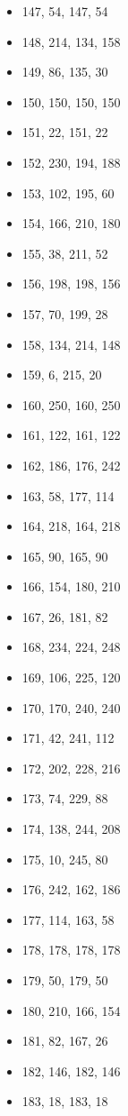 \documentclass[12pt, fleqn]{report}                             %
\theoremstyle{break}                                            %
\begin{document}
\begin{itemize}
        \item 147, 54, 147, 54
        \item 148, 214, 134, 158
        \item 149, 86, 135, 30
        \item 150, 150, 150, 150
        \item 151, 22, 151, 22
        \item 152, 230, 194, 188
        \item 153, 102, 195, 60
        \item 154, 166, 210, 180
        \item 155, 38, 211, 52
        \item 156, 198, 198, 156
        \item 157, 70, 199, 28
        \item 158, 134, 214, 148
        \item 159, 6, 215, 20
        \item 160, 250, 160, 250
        \item 161, 122, 161, 122
        \item 162, 186, 176, 242
        \item 163, 58, 177, 114
        \item 164, 218, 164, 218
        \item 165, 90, 165, 90
        \item 166, 154, 180, 210
        \item 167, 26, 181, 82
        \item 168, 234, 224, 248
        \item 169, 106, 225, 120
        \item 170, 170, 240, 240
        \item 171, 42, 241, 112
        \item 172, 202, 228, 216
        \item 173, 74, 229, 88
        \item 174, 138, 244, 208
        \item 175, 10, 245, 80
        \item 176, 242, 162, 186
        \item 177, 114, 163, 58
        \item 178, 178, 178, 178
        \item 179, 50, 179, 50
        \item 180, 210, 166, 154
        \item 181, 82, 167, 26
        \item 182, 146, 182, 146
        \item 183, 18, 183, 18

\end{itemize}
\end{document}
